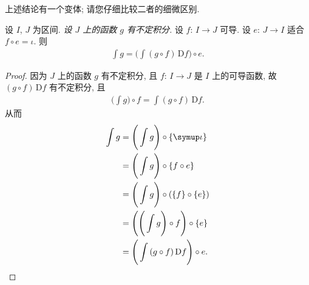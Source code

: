 上述结论有一个变体; 请您仔细比较二者的细微区别.

\begin{theorem}
    设 $I$, $J$ 为区间. \emph{设 $J$ 上的函数 $g$ 有不定积分.} 设 $f$: $I \to J$ 可导. 设 $e$: $J \to I$ 适合 $f \circ e = \iota$. 则
    \begin{align*}
        \int {g} = \Bigg( \int {(g \circ f)\,\mathrm{D}f} \Bigg) \circ e.
    \end{align*}
\end{theorem}

\begin{proof}
    因为 $J$ 上的函数 $g$ 有不定积分, 且 $f$: $I \to J$ 是 $I$ 上的可导函数, 故 $(g \circ f)\, \mathrm{D}f$ 有不定积分, 且
    \begin{align*}
        \Bigg( \int {g} \Bigg) \circ f = \int {(g \circ f)\,\mathrm{D}f}.
    \end{align*}
    从而
    \begin{align*}
        \int {g}
        = {} & \Bigg( \int {g} \Bigg) \circ \{ \iota \}                        \\
        = {} & \Bigg( \int {g} \Bigg) \circ \{ f \circ e \}                    \\
        = {} & \Bigg( \int {g} \Bigg) \circ (\{f\} \circ \{ e \})              \\
        = {} & \Bigg( \Bigg( \int {g} \Bigg) \circ f \Bigg) \circ \{ e \}      \\
        = {} & \Bigg( \int {(g \circ f)\,\mathrm{D}f} \Bigg) \circ e. \qedhere
    \end{align*}
\end{proof}


